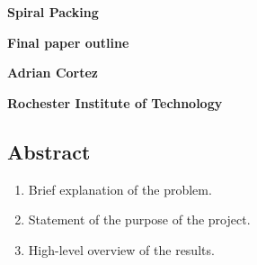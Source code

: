 \documentclass[11pt, oneside]{article}   	%
\begin{document}
\begin{center}
    \huge
    \textbf{Spiral Packing}

    \vspace{0.1cm}
    \normalsize
    \textbf{Final paper outline}
        
    \vspace{0.3cm}
    \large
    \textbf{Adrian Cortez}
    
    \vspace{0.1cm}
    \small
    \textbf{Rochester Institute of Technology}
    \vspace{0.3cm}
\end{center}

\subsection*{Abstract}
\begin{enumerate}
	\item Brief explanation of the problem.
	\item Statement of the purpose of the project.
	\item High-level overview of the results.
\end{enumerate}
\end{document}
